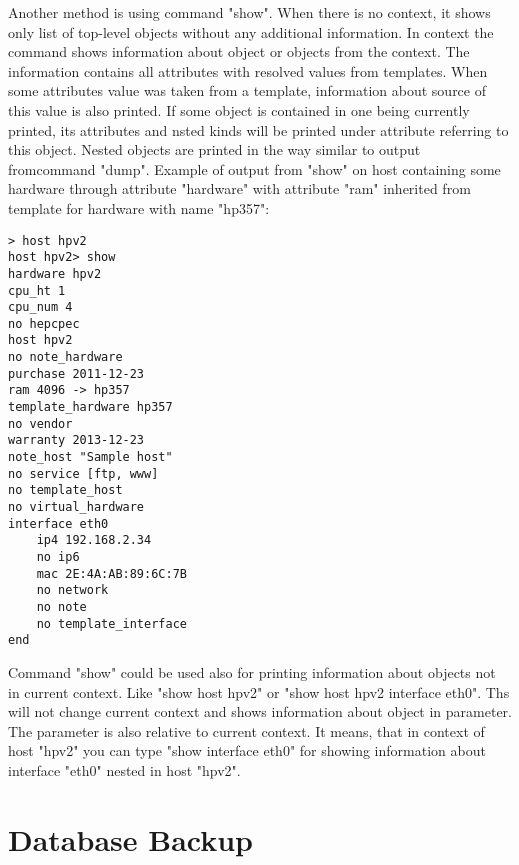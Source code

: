 \documentclass[deska]{subfiles}
\begin{document}
Another method is using command "show". When there is no context, it shows only list of top-level objects without any
additional information. In context the command shows information about object or objects from the context. The
information contains all attributes with resolved values from templates. When some attributes value was taken from
a template, information about source of this value is also printed. If some object is contained in one being currently
printed, its attributes and nsted kinds will be printed under attribute referring to this object. Nested objects are
printed in the way similar to output fromcommand "dump". Example of output from "show" on host containing some hardware
through attribute "hardware" with attribute "ram" inherited from template for hardware with name "hp357":

\begin{verbatim}
> host hpv2
host hpv2> show
hardware hpv2
cpu_ht 1
cpu_num 4
no hepcpec
host hpv2
no note_hardware
purchase 2011-12-23
ram 4096 -> hp357
template_hardware hp357
no vendor
warranty 2013-12-23
note_host "Sample host"
no service [ftp, www]
no template_host
no virtual_hardware
interface eth0
    ip4 192.168.2.34
    no ip6
    mac 2E:4A:AB:89:6C:7B
    no network
    no note
    no template_interface
end
\end{verbatim}

Command "show" could be used also for printing information about objects not in current context. Like "show host hpv2" or
"show host hpv2 interface eth0". Ths will not change current context and shows information about object in parameter.
The parameter is also relative to current context. It means, that in context of host "hpv2" you can type "show interface eth0"
for showing information about interface "eth0" nested in host "hpv2".

\section{Database Backup}
\label{sec:cli-db-backup}

\end{document}
